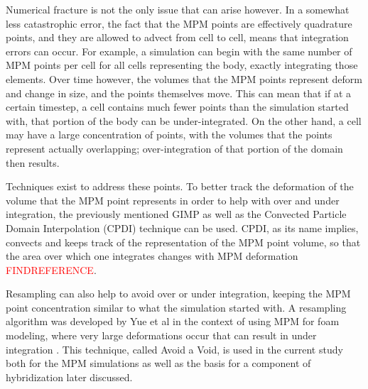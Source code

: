 Numerical fracture is not the only issue that can arise however. In a somewhat less catastrophic error, the fact that the MPM points are effectively quadrature points, and they are allowed to advect from cell to cell, means that integration errors can occur. For example, a simulation can begin with the same number of MPM points per cell for all cells representing the body, exactly integrating those elements. Over time however, the volumes that the MPM points represent deform and change in size, and the points themselves move. This can mean that if at a certain timestep, a cell contains much fewer points than the simulation started with, that portion of the body can be under-integrated. On the other hand, a cell may have a large concentration of points, with the volumes that the points represent actually overlapping; over-integration of that portion of the domain then results.

Techniques exist to address these points. To better track the deformation of the volume that the MPM point represents in order to help with over and under integration, the previously mentioned GIMP as well as the Convected Particle Domain Interpolation (CPDI) technique can be used. CPDI, as its name implies, convects and keeps track of the representation of the MPM point volume, so that the area over which one integrates changes with MPM deformation \textcolor{red}{FINDREFERENCE}.

Resampling can also help to avoid over or under integration, keeping the MPM point concentration similar to what the simulation started with. A resampling algorithm was developed by Yue et al in the context of using MPM for foam modeling, where very large deformations occur that can result in under integration \cite{Yue:2015:Continuum}. This technique, called Avoid a Void, is used in the current study both for the MPM simulations as well as the basis for a component of hybridization later discussed. 